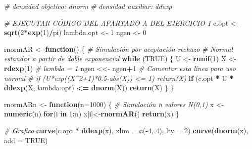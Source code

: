 \documentclass[]{book}
\newenvironment{Shaded}{\begin{snugshade}}{\end{snugshade}}
\newcommand{\KeywordTok}[1]{\textcolor[rgb]{0.13,0.29,0.53}{\textbf{#1}}}
\newcommand{\DataTypeTok}[1]{\textcolor[rgb]{0.13,0.29,0.53}{#1}}
\newcommand{\DecValTok}[1]{\textcolor[rgb]{0.00,0.00,0.81}{#1}}
\newcommand{\StringTok}[1]{\textcolor[rgb]{0.31,0.60,0.02}{#1}}
\newcommand{\CommentTok}[1]{\textcolor[rgb]{0.56,0.35,0.01}{\textit{#1}}}
\newcommand{\OtherTok}[1]{\textcolor[rgb]{0.56,0.35,0.01}{#1}}
\newcommand{\ControlFlowTok}[1]{\textcolor[rgb]{0.13,0.29,0.53}{\textbf{#1}}}
\newcommand{\OperatorTok}[1]{\textcolor[rgb]{0.81,0.36,0.00}{\textbf{#1}}}
\newcommand{\NormalTok}[1]{#1}
\theoremstyle{definition}
\theoremstyle{definition}
\theoremstyle{definition}
\theoremstyle{remark}
\begin{document}
\begin{Shaded}
\begin{Highlighting}[]
\CommentTok{# densidad objetivo: dnorm}
\CommentTok{# densidad auxiliar: ddexp}

\CommentTok{# EJECUTAR CÓDIGO DEL APARTADO A DEL EJERCICIO 1}
\NormalTok{c.opt <-}\StringTok{ }\KeywordTok{sqrt}\NormalTok{(}\DecValTok{2}\OperatorTok{*}\KeywordTok{exp}\NormalTok{(}\DecValTok{1}\NormalTok{)}\OperatorTok{/}\NormalTok{pi)}
\NormalTok{lambda.opt <-}\StringTok{ }\DecValTok{1}
\NormalTok{ngen <-}\StringTok{ }\DecValTok{0}

\NormalTok{rnormAR <-}\StringTok{ }\ControlFlowTok{function}\NormalTok{() \{}
\CommentTok{# Simulación por aceptación-rechazo}
\CommentTok{# Normal estandar a partir de doble exponencial}
  \ControlFlowTok{while}\NormalTok{ (}\OtherTok{TRUE}\NormalTok{) \{}
\NormalTok{    U <-}\StringTok{ }\KeywordTok{runif}\NormalTok{(}\DecValTok{1}\NormalTok{)}
\NormalTok{    X <-}\StringTok{ }\KeywordTok{rdexp}\NormalTok{(}\DecValTok{1}\NormalTok{) }\CommentTok{# lambda = 1}
\NormalTok{    ngen <<-}\StringTok{ }\NormalTok{ngen}\OperatorTok{+}\DecValTok{1} \CommentTok{# Comentar esta línea para uso normal}
    \CommentTok{# if (U*exp((X^2+1)*0.5-abs(X)) <= 1) return(X)}
    \ControlFlowTok{if}\NormalTok{ (c.opt }\OperatorTok{*}\StringTok{ }\NormalTok{U }\OperatorTok{*}\StringTok{ }\KeywordTok{ddexp}\NormalTok{(X, lambda.opt) }\OperatorTok{<=}\StringTok{ }\KeywordTok{dnorm}\NormalTok{(X)) }\KeywordTok{return}\NormalTok{(X)}
\NormalTok{  \}}
\NormalTok{\}}

\NormalTok{rnormARn <-}\StringTok{ }\ControlFlowTok{function}\NormalTok{(}\DataTypeTok{n=}\DecValTok{1000}\NormalTok{) \{}
\CommentTok{# Simulación n valores N(0,1)}
\NormalTok{    x <-}\StringTok{ }\KeywordTok{numeric}\NormalTok{(n)}
    \ControlFlowTok{for}\NormalTok{(i }\ControlFlowTok{in} \DecValTok{1}\OperatorTok{:}\NormalTok{n) x[i]<-}\KeywordTok{rnormAR}\NormalTok{()}
    \KeywordTok{return}\NormalTok{(x)}
\NormalTok{\}}

\CommentTok{# Grafico}
\KeywordTok{curve}\NormalTok{(c.opt }\OperatorTok{*}\StringTok{ }\KeywordTok{ddexp}\NormalTok{(x), }\DataTypeTok{xlim =} \KeywordTok{c}\NormalTok{(}\OperatorTok{-}\DecValTok{4}\NormalTok{, }\DecValTok{4}\NormalTok{), }\DataTypeTok{lty =} \DecValTok{2}\NormalTok{)}
\KeywordTok{curve}\NormalTok{(}\KeywordTok{dnorm}\NormalTok{(x), }\DataTypeTok{add =} \OtherTok{TRUE}\NormalTok{)}
\end{Highlighting}
\end{Shaded}
\end{document}
